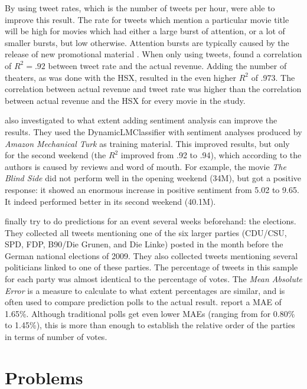 \documentclass[12pt]{article}
\begin{document}
By using tweet rates, which is the number of tweets per hour,  were able to improve this result. The rate for tweets which mention a particular movie title will be high for movies which had either a large burst of attention, or a lot of smaller bursts, but low otherwise. Attention bursts are typically caused by the release of new promotional material \cite{asur+10}. When only using tweets,  found a correlation of $R^2 = .92$ between tweet rate and the actual revenue. Adding the number of theaters, as was done with the HSX, resulted in the even higher $R^2$ of .973. The correlation between actual revenue and tweet rate was higher than the correlation between actual revenue and the HSX for every movie in the study.

 also investigated to what extent adding sentiment analysis can improve the results. They used the DynamicLMClassifier with sentiment analyses produced by \emph{Amazon Mechanical Turk} as training material. This improved results, but only for the second weekend (the $R^2$ improved from .92 to .94), which according to the authors is caused by reviews and word of mouth. For example, the movie \emph{The Blind Side} did not perform well in the opening weekend (34M), but got a positive response: it showed an enormous increase in positive sentiment from 5.02 to 9.65. It indeed performed better in its second weekend (40.1M). 

 finally try to do predictions for an event several weeks beforehand: the elections. They collected all tweets mentioning one of the six larger parties (CDU/CSU, SPD, FDP, B90/Die Grunen, and Die Linke) posted in the month before the German national elections of 2009. They also collected tweets mentioning several politicians linked to one of these parties. The percentage of tweets in this sample for each party was almost identical to the percentage of votes. The \emph{Mean Absolute Error} is a measure to calculate to what extent percentages are similar, and is often used to compare prediction polls to the actual result.  report a MAE of 1.65\%. Although traditional polls get even lower MAEs (ranging from for 0.80\% to 1.45\%), this is more than enough to establish the relative order of the parties in terms of number of votes. 

\section{Problems} \label{problems}
\end{document}
